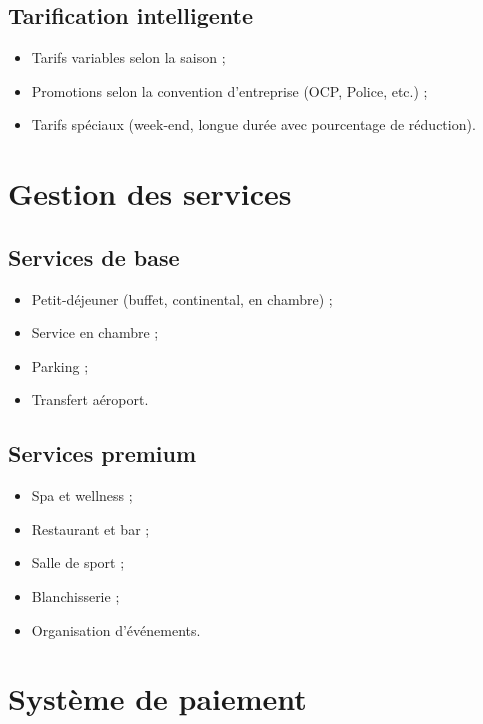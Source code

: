 \documentclass[12pt,a4paper]{report}
\begin{document}
\subsection{Tarification intelligente}

\begin{itemize}
  \item Tarifs variables selon la saison ;
  \item Promotions selon la convention d'entreprise (OCP, Police, etc.) ;
  \item Tarifs spéciaux (week-end, longue durée avec pourcentage de réduction).
\end{itemize}

\section{Gestion des services}

\subsection{Services de base}

\begin{itemize}
  \item Petit-déjeuner (buffet, continental, en chambre) ;
  \item Service en chambre ;
  \item Parking ;
  \item Transfert aéroport.
\end{itemize}

\subsection{Services premium}

\begin{itemize}
  \item Spa et wellness ;
  \item Restaurant et bar ;
  \item Salle de sport ;
  \item Blanchisserie ;
  \item Organisation d'événements.
\end{itemize}

\section{Système de paiement}
\end{document}
